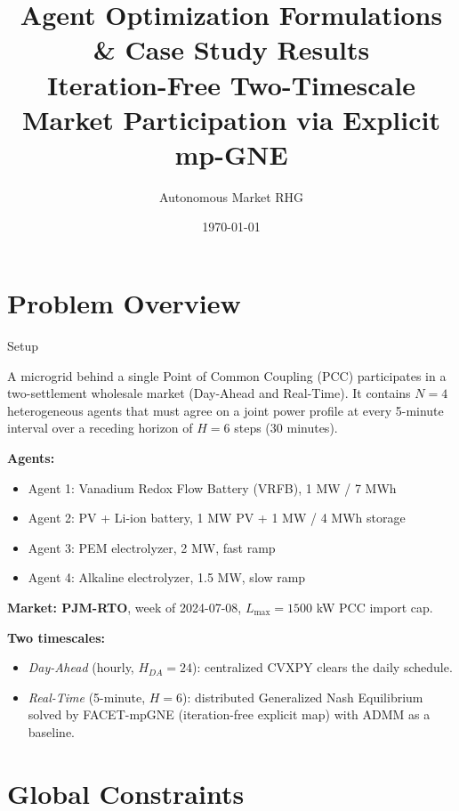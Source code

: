 \documentclass[11pt, letterpaper]{article}
\title{\textbf{Agent Optimization Formulations \& Case Study Results} \\[4pt]
\large Iteration-Free Two-Timescale Market Participation via Explicit mp-GNE}
\author{Autonomous Market RHG}
\date{\today}
\begin{document}
\maketitle
\tableofcontents
\newpage

\section{Problem Overview}

\begin{answerbox}{Setup}

A microgrid behind a single Point of Common Coupling (PCC) participates in a two-settlement wholesale market (Day-Ahead and Real-Time). It contains $N = 4$ heterogeneous agents that must agree on a joint power profile at every 5-minute interval over a receding horizon of $H = 6$ steps (30 minutes).

\textbf{Agents:}
\begin{itemize}[nosep]
    \item Agent 1: Vanadium Redox Flow Battery (VRFB), 1 MW / 7 MWh
    \item Agent 2: PV + Li-ion battery, 1 MW PV + 1 MW / 4 MWh storage
    \item Agent 3: PEM electrolyzer, 2 MW, fast ramp
    \item Agent 4: Alkaline electrolyzer, 1.5 MW, slow ramp
\end{itemize}

\textbf{Market: PJM-RTO}, week of 2024-07-08, $L_{\max} = 1500$ kW PCC import cap.

\textbf{Two timescales:}
\begin{itemize}[nosep]
    \item \emph{Day-Ahead} (hourly, $H_{DA} = 24$): centralized CVXPY clears the daily schedule.
    \item \emph{Real-Time} (5-minute, $H = 6$): distributed Generalized Nash Equilibrium solved by FACET-mpGNE (iteration-free explicit map) with ADMM as a baseline.
\end{itemize}

\end{answerbox}

\section{Global Constraints}
\end{document}
